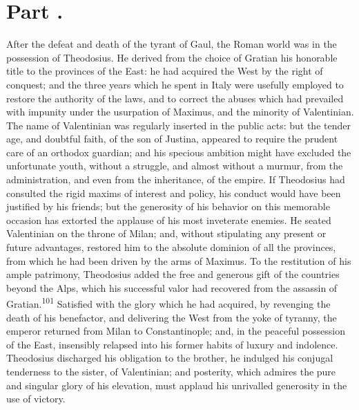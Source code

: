 

\section{Part \thesection.}

After the defeat and death of the tyrant of Gaul, the Roman world
was in the possession of Theodosius. He derived from the choice
of Gratian his honorable title to the provinces of the East: he
had acquired the West by the right of conquest; and the three
years which he spent in Italy were usefully employed to restore
the authority of the laws, and to correct the abuses which had
prevailed with impunity under the usurpation of Maximus, and the
minority of Valentinian. The name of Valentinian was regularly
inserted in the public acts: but the tender age, and doubtful
faith, of the son of Justina, appeared to require the prudent
care of an orthodox guardian; and his specious ambition might
have excluded the unfortunate youth, without a struggle, and
almost without a murmur, from the administration, and even from
the inheritance, of the empire. If Theodosius had consulted the
rigid maxims of interest and policy, his conduct would have been
justified by his friends; but the generosity of his behavior on
this memorable occasion has extorted the applause of his most
inveterate enemies. He seated Valentinian on the throne of Milan;
and, without stipulating any present or future advantages,
restored him to the absolute dominion of all the provinces, from
which he had been driven by the arms of Maximus. To the
restitution of his ample patrimony, Theodosius added the free and
generous gift of the countries beyond the Alps, which his
successful valor had recovered from the assassin of Gratian.\textsuperscript{101}
Satisfied with the glory which he had acquired, by revenging the
death of his benefactor, and delivering the West from the yoke of
tyranny, the emperor returned from Milan to Constantinople; and,
in the peaceful possession of the East, insensibly relapsed into
his former habits of luxury and indolence. Theodosius discharged
his obligation to the brother, he indulged his conjugal
tenderness to the sister, of Valentinian; and posterity, which
admires the pure and singular glory of his elevation, must
applaud his unrivalled generosity in the use of victory.

